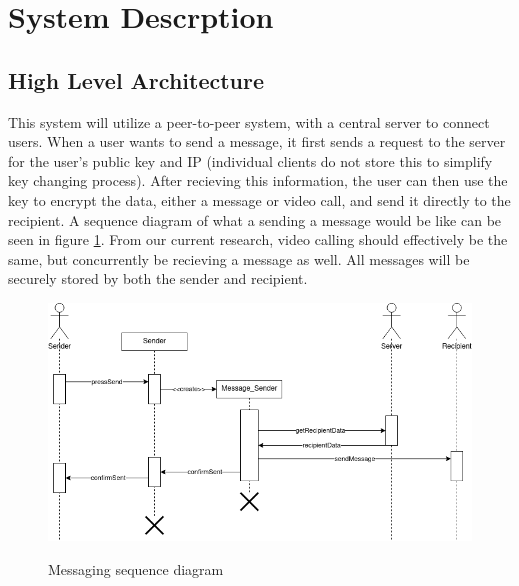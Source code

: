 \documentclass[titlepage]{article}
\begin{document}
    \section{System Descrption}

    \subsection{High Level Architecture}

    This system will utilize a peer-to-peer system, with a central server to connect users.
    When a user wants to send a message, it first sends a request to the server for the user's public key and IP (individual clients do not store this to simplify key changing process).
    After recieving this information, the user can then use the key to encrypt the data, either a message or video call, and send it directly to the recipient.
    A sequence diagram of what a sending a message would be like can be seen in figure \ref{sequence}.
    From our current research, video calling should effectively be the same, but concurrently be recieving a message as well.
    All messages will be securely stored by both the sender and recipient.

    \begin{center}
        \begin{figure}[!ht]
            \includegraphics[scale=.5]{graphics/SequenceDiagram.png}
            \label{sequence}
            \caption{Messaging sequence diagram}
        \end{figure}
    \end{center}
\end{document}
